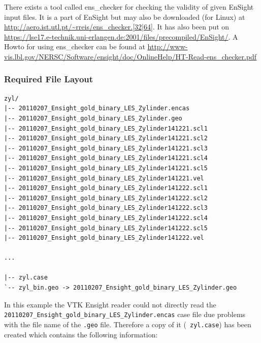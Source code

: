 \documentclass[a4paper,10pt]{article}
\begin{document}
There  exists a tool  called ens\_checker  for checking  the validity  of given
EnSight input files. It  is a part of EnSight but may  also be downloaded (for
Linux) at \url{http://aero.ist.utl.pt/~rreis/ens_checker.[32|64]}. It has also
been                                   put                                  on
\url{https://lse17.e-technik.uni-erlangen.de:2001/files/precompiled/EnSight/}.
A     Howto     for     using      ens\_checker     can     be     found     at
\url{http://www-vis.lbl.gov/NERSC/Software/ensight/doc/OnlineHelp/HT-Read-ens_checker.pdf}



\subsubsection{Required File Layout}
\begin{verbatim}
zyl/
|-- 20110207_Ensight_gold_binary_LES_Zylinder.encas
|-- 20110207_Ensight_gold_binary_LES_Zylinder.geo
|-- 20110207_Ensight_gold_binary_LES_Zylinder141221.scl1
|-- 20110207_Ensight_gold_binary_LES_Zylinder141221.scl2
|-- 20110207_Ensight_gold_binary_LES_Zylinder141221.scl3
|-- 20110207_Ensight_gold_binary_LES_Zylinder141221.scl4
|-- 20110207_Ensight_gold_binary_LES_Zylinder141221.scl5
|-- 20110207_Ensight_gold_binary_LES_Zylinder141221.vel
|-- 20110207_Ensight_gold_binary_LES_Zylinder141222.scl1
|-- 20110207_Ensight_gold_binary_LES_Zylinder141222.scl2
|-- 20110207_Ensight_gold_binary_LES_Zylinder141222.scl3
|-- 20110207_Ensight_gold_binary_LES_Zylinder141222.scl4
|-- 20110207_Ensight_gold_binary_LES_Zylinder141222.scl5
|-- 20110207_Ensight_gold_binary_LES_Zylinder141222.vel

...

|-- zyl.case
`-- zyl_bin.geo -> 20110207_Ensight_gold_binary_LES_Zylinder.geo
\end{verbatim}

In  this example  the VTK  Ensight  reader could  not directly  read the  {\tt
20110207\_Ensight\_gold\_binary\_LES\_Zylinder.encas}  case file  due problems
with  the file  name of  the {\tt  .geo} file.  Therefore a  copy of  it ({\tt
zyl.case}) has been created which contains the following information:
\end{document}
